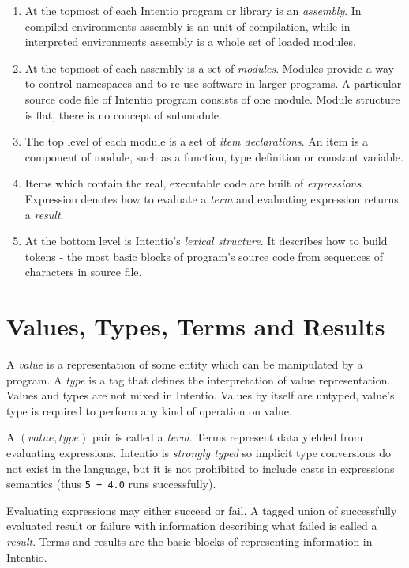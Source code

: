 \begin{enumerate}
  \item At the topmost of each Intentio program or library is an \emph{assembly}. In compiled environments assembly is an unit of compilation, while in interpreted environments assembly is a whole set of loaded modules.
  \item At the topmost of each assembly is a set of \emph{modules}. Modules provide a way to control namespaces and to re-use software in larger programs. A particular source code file of Intentio program consists of one module. Module structure is flat, there is no concept of submodule.
  \item The top level of each module is a set of \emph{item declarations}. An item is a component of module, such as a function, type definition or constant variable.
  \item Items which contain the real, executable code are built of \emph{expressions}. Expression denotes how to evaluate a \emph{term} and evaluating expression returns a \emph{result}.
  \item At the bottom level is Intentio's \emph{lexical structure}. It describes how to build tokens - the most basic blocks of program's source code from sequences of characters in source file.
\end{enumerate}


\section{Values, Types, Terms and Results}

A \emph{value} is a representation of some entity which can be manipulated by a program. A \emph{type} is a tag that defines the interpretation of value representation. Values and types are not mixed in Intentio. Values by itself are untyped, value's type is required to perform any kind of operation on value.

A \((value, type)\) pair is called a \emph{term}. Terms represent data yielded from evaluating expressions. Intentio is \emph{strongly typed} so implicit type conversions do not exist in the language, but it is not prohibited to include casts in expressions semantics (thus \lstinline{5 + 4.0} runs successfully).

Evaluating expressions may either succeed or fail. A tagged union of successfully evaluated result or failure with information describing what failed is called a \emph{result}. Terms and results are the basic blocks of representing information in Intentio.

